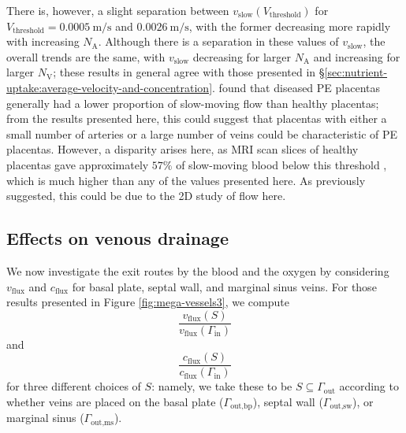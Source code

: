             There is, however, a slight separation between $v_\text{slow}(V_\text{threshold})$ for $V_\text{threshold} = \qty{0.0005}{\metre\per\second}$ and $\qty{0.0026}{\metre\per\second}$, with the former decreasing more rapidly with increasing $N_\text{A}$. Although there is a separation in these values of $v_\text{slow}$, the overall trends are the same, with $v_\text{slow}$ decreasing for larger $N_\text{A}$ and increasing for larger $N_\text{V}$; these results in general agree with those presented in \S\ref{sec:nutrient-uptake:average-velocity-and-concentration}. \citeauthor{dellschaftHaemodynamicsHumanPlacenta2020} \cite{dellschaftHaemodynamicsHumanPlacenta2020} found that diseased PE placentas generally had a lower proportion of slow-moving flow than healthy placentas; from the results presented here, this could suggest that placentas with either a small number of arteries or a large number of veins could be characteristic of PE placentas. However, a disparity arises here, as MRI scan slices of healthy placentas gave approximately $57\%$ of slow-moving blood below this threshold \cite{dellschaftHaemodynamicsHumanPlacenta2020}, which is much higher than any of the values presented here. As previously suggested, this could be due to the 2D study of flow here.

        \subsection{Effects on venous drainage}
            We now investigate the exit routes by the blood and the oxygen by considering $v_\text{flux}$ and $c_\text{flux}$ for basal plate, septal wall, and marginal sinus veins. For those results presented in Figure \ref{fig:mega-vessels3}, we compute
            \begin{equation*}
                \frac{v_\text{flux}(S)}{v_\text{flux}(\Gamma_\text{in})}
            \end{equation*}
            and
            \begin{equation*}
                \frac{c_\text{flux}(S)}{c_\text{flux}(\Gamma_\text{in})}
            \end{equation*}
            for three different choices of $S$: namely, we take these to be $S \subseteq \Gamma_\text{out}$ according to whether veins are placed on the basal plate ($\Gamma_\text{out,bp}$), septal wall ($\Gamma_\text{out,sw}$), or marginal sinus ($\Gamma_\text{out,ms}$).

